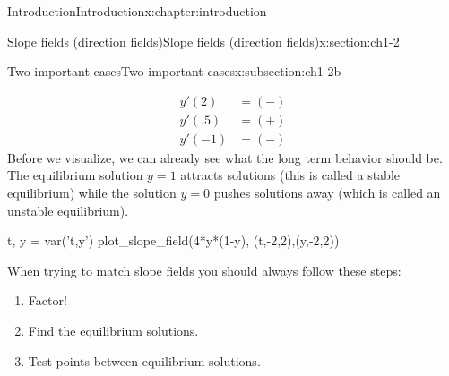 \documentclass[oneside,10pt,]{book}
\numberwithin{equation}{section}
\numberwithin{equation}{section}
\newcommand{\amp}{&}
\begin{document}
\begin{chapterptx}{Introduction}{}{Introduction}{}{}{x:chapter:introduction}
\begin{sectionptx}{Slope fields (direction fields)}{}{Slope fields (direction fields)}{}{}{x:section:ch1-2}
\begin{subsectionptx}{Two important cases}{}{Two important cases}{}{}{x:subsection:ch1-2b}
\begin{itemize}[label=\textbullet]
\begin{align*}
y'(2) \amp= (-)\\
y'(.5) \amp= (+)\\
y'(-1) \amp= (-)
\end{align*}
Before we visualize, we can already see what the long term behavior should be. The equilibrium solution \(y = 1\) attracts solutions (this is called a stable equilibrium) while the solution \(y = 0\) pushes solutions away (which is called an unstable equilibrium).%
\begin{sageinput}
t, y  = var('t,y')
plot_slope_field(4*y*(1-y), (t,-2,2),(y,-2,2))
\end{sageinput}
\end{itemize}
 When trying to match slope fields you should always follow these steps: %
\begin{enumerate}
\item{}Factor!%
\item{}Find the equilibrium solutions.%
\item{}Test points between equilibrium solutions.%
\end{enumerate}
\end{subsectionptx}
\end{sectionptx}
\end{chapterptx}
%
%
\typeout{************************************************}
\typeout{************************************************}
%
\end{document}

